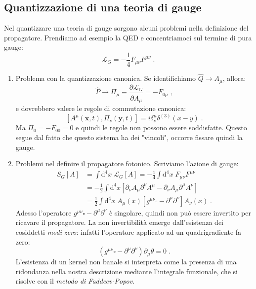 \documentclass[12pt,a4paper]{article}
\theoremstyle{definition}
\newcommand{\pdev}[3][]{\frac{\partial^{#1} #2}{\partial #3^{#1}}}
\newcommand{\lag}{\mathcal{L}}
\newcommand{\diff}[1][]{\mathrm{d}#1}
\numberwithin{equation}{section}
\begin{document}
\subsection{Quantizzazione di una teoria di gauge}
Nel quantizzare una teoria di gauge sorgono alcuni problemi nella definizione del propagatore. Prendiamo ad esempio la QED e concentriamoci sul termine di pura gauge:
$$
\lag_G=-\frac{1}{4}F_{\mu\nu}F^{\mu\nu}\;.
$$
\begin{enumerate}
\item Problema con la quantizzazione canonica. Se identifichiamo $\hat{Q}\to A_{\mu}$, allora:
$$
\hat{P}\to\Pi_{\mu}\equiv\pdev{\lag_G}{\dot{A}_{\mu}}=-F_{0\mu}\;,
$$
e dovrebbero valere le regole di commutazione canonica:
$$
[A^{\mu}(\mathbf{x},t),\Pi_{\nu}(\mathbf{y},t)]=i\delta^{\mu}_{\nu}\delta^{(3)}(x-y)\;.
$$
Ma $\Pi_0=-F_{00}=0$ e quindi le regole non possono essere soddisfatte. Questo segue dal fatto che questo sistema ha dei "vincoli", occorre fissare quindi la gauge.
\item Problemi nel definire il propagatore fotonico. Scriviamo l'azione di gauge:
\begin{align*}
S_G[A]&=\int\diff^4{x}\;\lag_G[A]=-\frac{1}{4}\int\diff^4{x}\;F_{\mu\nu}F^{\mu\nu} \\
&=-\frac{1}{2}\int\diff^4{x}[\partial_{\nu}A_{\mu}\partial^{\nu}A^{\mu}-\partial_{\nu}A_{\mu}\partial^{\mu}A^{\nu}] \\
&=\frac{1}{2}\int\diff^4{x}\;A_{\mu}(x)[g^{\mu\nu}\square-\partial^{\mu}\partial^{\nu}]A_{\nu}(x)\;.
\end{align*}
Adesso l'operatore $g^{\mu\nu}\square-\partial^{\mu}\partial^{\nu}$ è singolare, quindi non può essere invertito per ricavare il propagatore. La non invertibilità emerge dall'esistenza dei cosiddetti \emph{modi zero}: infatti l'operatore applicato ad un quadrigradiente fa zero:
$$
(g^{\mu\nu}\square-\partial^{\mu}\partial^{\nu})\partial_{\mu}\theta=0\;.
$$
L'esistenza di un kernel non banale si interpreta come la presenza di una ridondanza nella nostra descrizione mediante l'integrale funzionale, che si risolve con il \emph{metodo di Faddeev-Popov}.
\end{enumerate}
\end{document}
